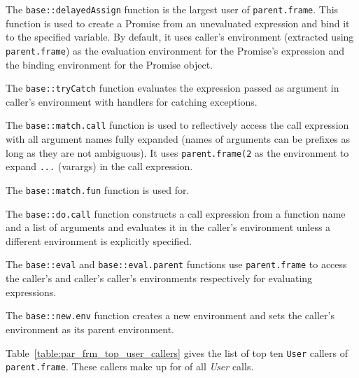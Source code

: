 \documentclass[10pt,review,sigplan,anonymous=true,authorversion=true,nonacm=true]{acmart}
\renewcommand{\c}[1]{\lstinline |#1|\xspace}
\begin{document}
The \c{base::delayedAssign} function is the largest user of \c{parent.frame}.
This function is used to create a Promise from an unevaluated expression and
bind it to the specified variable. By default, it uses caller's environment
(extracted using \c{parent.frame}) as the evaluation environment for the
Promise's expression and the binding environment for the Promise object.

The \c{base::tryCatch} function evaluates the expression passed as argument in
caller's environment with handlers for catching exceptions.

The \c{base::match.call} function is used to reflectively access the call
expression with all argument names fully expanded (names of arguments can be
prefixes as long as they are not ambiguous). It uses \c{parent.frame(2} as the
environment to expand \c{...} (varargs) in the call expression.

The \c{base::match.fun} function is used for.

The \c{base::do.call} function constructs a call expression from a function name
and a list of arguments and evaluates it in the caller's environment unless a
different environment is explicitly specified.

The \c{base::eval} and \c{base::eval.parent} functions use \c{parent.frame} to
access the caller's and caller's caller's environments respectively for
evaluating expressions.

The \c{base::new.env} function creates a new environment and sets the caller's
environment as its parent environment.

Table~\ref{table:par_frm_top_user_callers} gives the list of top ten \c{User}
callers of \c{parent.frame}. These callers make up for
\ParentFrameUserTopTenCallPerc of all \emph{User} calls.
\end{document}
